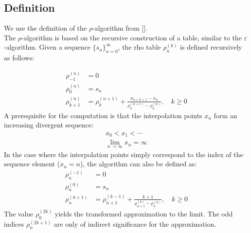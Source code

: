 \documentclass[a4paper,12pt]{article}
\numberwithin{equation}{section}
\theoremstyle{remark}
\begin{document}
\subsection{Definition}\label{subsec:def}
We use the definition of the $\rho$-algorithm from [\cite[34-35]{weniger1996nonlinear}].\\
The $\rho$-algorithm is based on the recursive construction of a table, similar to the $\varepsilon$-algorithm. Given a sequence $\{s_n\}_{n=0}^{\infty}$, the rho table $\rho^{(k)}_n$ is defined recursively as follows:

\begin{align}
\rho^{(n)}_{-1} &= 0 \quad\\
\rho^{(n)}_0 &= s_n \\
\rho^{(n)}_{k+1} &= \rho^{(n+1)}_{k} + \frac{x_{n+k+1}-x_{n}}{\rho^{(n+1)}_{k} - \rho^{(n)}_k}, \quad k \ge 0 \label{eq:rhodef}
\end{align}
A prerequisite for the computation is that the interpolation points $x_n$ form an increasing divergent sequence:
\begin{gather*}
x_0<x_1<\cdots\\
\lim_{n\rightarrow\infty}x_{n}=\infty
\end{gather*}
In the case where the interpolation points simply correspond to the index of the sequence element ($x_n = n$), the algorithm can also be defined as:
\begin{align}
\rho^{(-1)}_n &= 0 \quad\\
\rho^{(0)}_n &= s_n \\
\rho^{(k+1)}_n &= \rho^{(k-1)}_{n+1} + \frac{k+1}{\rho^{(k)}_{n+1} - \rho^{(k)}_n}, \quad k \ge 0 \label{eq:rho_rek}
\end{align}
The value $\rho^{(2k)}_0$ yields the transformed approximation to the limit. The odd indices $\rho^{(2k+1)}_n$ are only of indirect significance for the approximation.
\end{document}
